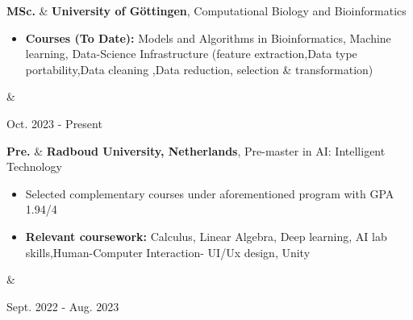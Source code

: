 \documentclass[10pt, letterpaper]{article}
\newenvironment{highlights}{
        \begin{itemize}[
                topsep=0pt,
                parsep=0.10 cm,
                partopsep=0pt,
                itemsep=0pt,
                after=\vspace{-1\baselineskip},
                leftmargin=0.4 cm + 3pt
            ]
    }{
        \end{itemize}
    } %
\let\hrefWithoutArrow\href
\renewcommand{\href}[2]{\hrefWithoutArrow{#1}{\mbox{\ifthenelse{\equal{#2}{}}{ }{#2 }\raisebox{.15ex}{\footnotesize \faExternalLink*}}}}
\let\originalTabularx\tabularx
\let\originalEndTabularx\endtabularx
\renewenvironment{tabularx}{\bgroup\centering\originalTabularx}{\originalEndTabularx\par\egroup}
\begin{document}
        \begin{tabularx}{
            \textwidth-0.4 cm-0.13cm
        }{
            L{0.85cm}
            K{0.2 cm}
            R{4.1 cm}
        }
            \textbf{MSc.}
            &
            \textbf{ University of Göttingen}, Computational Biology and Bioinformatics

            \vspace{0.10 cm}

            \begin{highlights}
                \item \textbf{Courses (To Date):} Models and Algorithms in Bioinformatics, Machine learning, Data-Science Infrastructure (feature extraction,Data type portability,Data cleaning ,Data reduction, selection \& transformation)

            \end{highlights}
            &
            

            Oct. 2023 - Present
        \end{tabularx}
  
        \vspace{0.20 cm}

        \begin{tabularx}{
            \textwidth-0.4 cm-0.13cm
        }{
            L{0.85cm}
            K{0.2 cm}
            R{4.1 cm}
        }
            \textbf{Pre. }
            &
            \textbf{Radboud University, Netherlands}, Pre-master in AI: Intelligent Technology

            \vspace{0.10 cm}

            \begin{highlights}
                \item Selected complementary courses under aforementioned program with GPA 1.94/4
                
                \item \textbf{Relevant coursework: }Calculus, Linear Algebra, Deep learning, AI lab skills,Human-Computer Interaction- UI/Ux design, Unity
            \end{highlights}
            &
            

            Sept. 2022 - Aug. 2023
        \end{tabularx}
        
\end{document}
